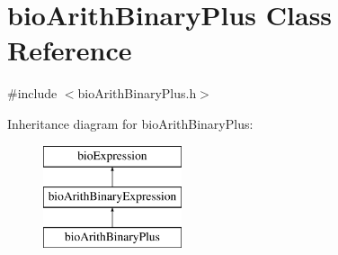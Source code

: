 \hypertarget{classbio_arith_binary_plus}{}\section{bio\+Arith\+Binary\+Plus Class Reference}
\label{classbio_arith_binary_plus}


{\ttfamily \#include $<$bio\+Arith\+Binary\+Plus.\+h$>$}

Inheritance diagram for bio\+Arith\+Binary\+Plus\+:\begin{figure}[H]
\begin{center}
\leavevmode
\includegraphics[height=3.000000cm]{classbio_arith_binary_plus}
\end{center}
\end{figure}
